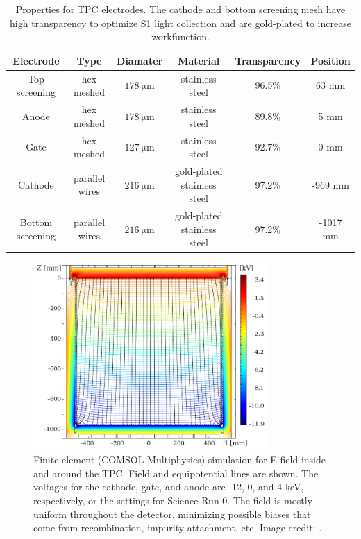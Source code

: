 \begin{table}
\centering
\begin{tabular}{cccccc}
\hline
Electrode & Type & Diamater & Material & Transparency & Position \\
\hline
Top screening & hex meshed & $178\ \mathrm{\mu m}$ & stainless steel & 96.5\% & 63 mm \\
Anode & hex meshed & $178\ \mathrm{\mu m}$ & stainless steel & 89.8\% & 5 mm \\
Gate & hex meshed & $127\ \mathrm{\mu m}$ & stainless steel & 92.7\% & 0 mm \\
Cathode & parallel wires & $216\ \mathrm{\mu m}$ & gold-plated stainless steel & 97.2\% & -969 mm \\
Bottom screening & parallel wires & $216\ \mathrm{\mu m}$ & gold-plated stainless steel & 97.2\% & -1017 mm \\
\hline
\end{tabular}
\caption{Properties for TPC electrodes.  The cathode and bottom screening mesh have high transparency to optimize S1 light collection and
are gold-plated to increase workfunction.}
\label{tab:xenon1t_tpc_electrodes}
\end{table}

\begin{figure}
\centering
\includegraphics[width=0.8\textwidth]{ElectricField}
\caption{Finite element (COMSOL Multiphysics) simulation for E-field inside and around the TPC.  Field and equipotential lines are
shown.  The voltages for the cathode, gate, and anode are -12, 0, and 4 keV, respectively, or the settings for Science Run 0.  The field
is mostly uniform throughout the detector, minimizing possible biases that come from recombination, impurity attachment, etc.  Image
credit: .}
\label{fig:xenon1t_tpc_efield}
\end{figure}

